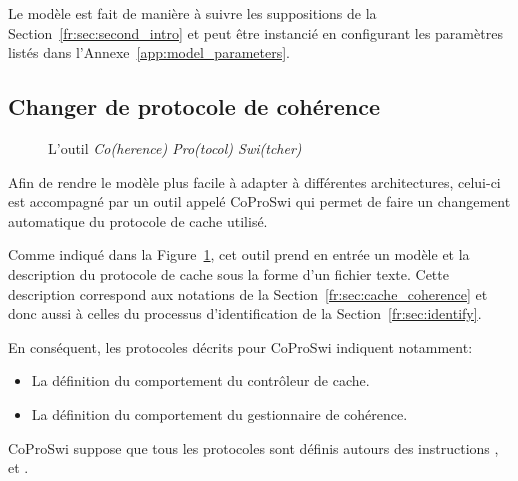 Le modèle est fait de manière à suivre les suppositions de la
Section~\ref{fr:sec:second_intro} et peut être instancié en configurant les
paramètres listés dans l'Annexe~\ref{app:model_parameters}.

\subsection{Changer de protocole de cohérence}
\label{fr:sec:protocol_switching}

\begin{figure}[hbt!]
\begin{center}

\end{center}
\caption{L'outil \textit{Co(herence) Pro(tocol) Swi(tcher)}}
\label{fr:fig:second_intro:coproswi}
\end{figure}
Afin de rendre le modèle plus facile à adapter à différentes architectures,
celui-ci est accompagné par un outil appelé CoProSwi qui permet de faire un
changement automatique du protocole de cache utilisé.

Comme indiqué dans la Figure~\ref{fr:fig:second_intro:coproswi}, cet outil prend
en entrée un modèle et la description du protocole de cache sous la forme d'un
fichier texte. Cette description correspond aux notations de la
Section~\ref{fr:sec:cache_coherence} et donc aussi à celles du processus
d'identification de la Section~\ref{fr:sec:identify}.

En conséquent, les protocoles décrits pour CoProSwi indiquent notamment:
\begin{itemize}
    \setlength{\itemsep}{0pt}%
   \setlength{\parskip}{0pt}%
\item La définition du comportement du contrôleur de cache.
\item La définition du comportement du gestionnaire de cohérence.
\end{itemize}

CoProSwi suppose que tous les protocoles sont définis autours des
instructions \loadinstr{}, \storeinstr{} et \evictinstr{}.

